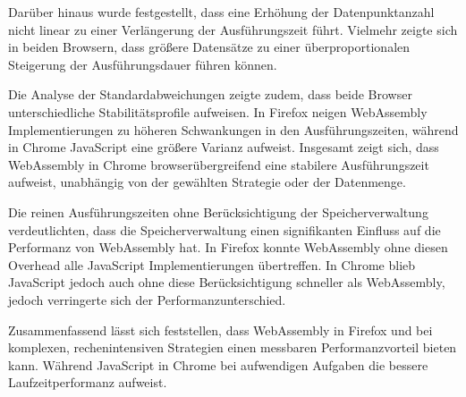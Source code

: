 Darüber hinaus wurde festgestellt, dass eine Erhöhung der Datenpunktanzahl nicht linear zu einer Verlängerung der Ausführungszeit führt.
Vielmehr zeigte sich in beiden Browsern, dass größere Datensätze zu einer überproportionalen Steigerung der Ausführungsdauer führen können.

Die Analyse der Standardabweichungen zeigte zudem, dass beide Browser unterschiedliche Stabilitätsprofile aufweisen.
In Firefox neigen WebAssembly Implementierungen zu höheren Schwankungen in den Ausführungszeiten, während in Chrome JavaScript eine größere Varianz aufweist.
Insgesamt zeigt sich, dass WebAssembly in Chrome browserübergreifend eine stabilere Ausführungszeit aufweist, unabhängig von der gewählten Strategie oder der Datenmenge.

Die reinen Ausführungszeiten ohne Berücksichtigung der Speicherverwaltung verdeutlichten, dass die Speicherverwaltung einen signifikanten Einfluss auf die Performanz von WebAssembly hat.
In Firefox konnte WebAssembly ohne diesen Overhead alle JavaScript Implementierungen übertreffen.
In Chrome blieb JavaScript jedoch auch ohne diese Berücksichtigung schneller als WebAssembly, jedoch verringerte sich der Performanzunterschied.

Zusammenfassend lässt sich feststellen, dass WebAssembly in Firefox und bei komplexen, rechenintensiven Strategien einen messbaren Performanzvorteil bieten kann.
Während JavaScript in Chrome bei aufwendigen Aufgaben die bessere Laufzeitperformanz aufweist.